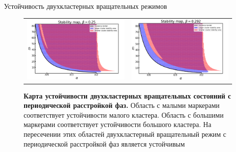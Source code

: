 \begin{chapter}{Устойчивость двухкластерных вращательных режимов}
	
	\begin{figure}[h!]\center
		\begin{tabular}{cc}
		\includegraphics[width=0.5\columnwidth]{pictures/map-0-25.png}
		&
		\includegraphics[width=0.5\columnwidth]{pictures/map-0-292.png}
		\end{tabular}
		\caption{\textbf{Карта устойчивости двухкластерных вращательных состояний с периодической расстройкой фаз.}
		Область с малыми маркерами соответствует устойчивости малого кластера.
		Область с большими маркерами соответствует устойчивости большого кластера.
		На пересечении этих областей двухкластерный вращательный режим с периодической расстройкой фаз является устойчивым}
		\label{map-025}
	\end{figure}


\end{chapter}
